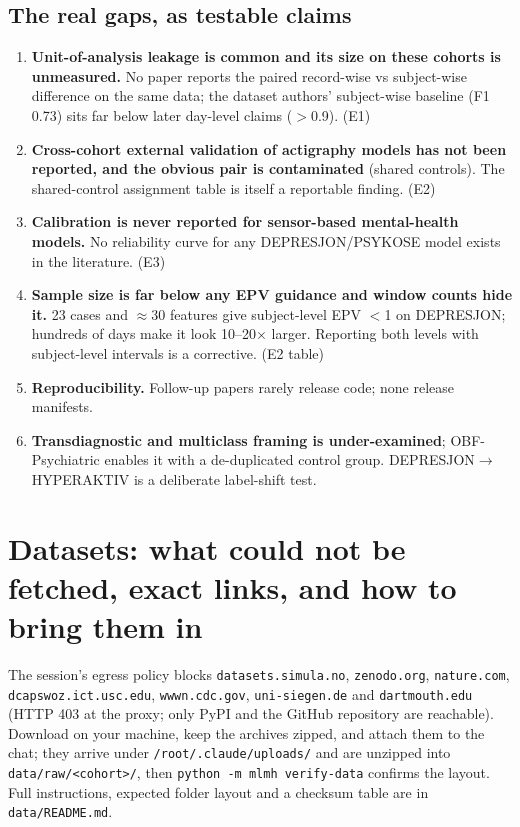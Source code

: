 \documentclass[11pt,a4paper]{article}
\begin{document}
\subsection{The real gaps, as testable claims}
\begin{enumerate}
\item \textbf{Unit-of-analysis leakage is common and its size on these cohorts is unmeasured.} No
paper reports the paired record-wise vs subject-wise difference on the same data; the dataset
authors' subject-wise baseline (F1 0.73) sits far below later day-level claims ($>$0.9). (E1)
\item \textbf{Cross-cohort external validation of actigraphy models has not been reported, and the
obvious pair is contaminated} (shared controls). The shared-control assignment table is itself a
reportable finding. (E2)
\item \textbf{Calibration is never reported for sensor-based mental-health models.} No reliability
curve for any DEPRESJON/PSYKOSE model exists in the literature. (E3)
\item \textbf{Sample size is far below any EPV guidance and window counts hide it.} 23 cases and
$\approx$30 features give subject-level EPV $<$1 on DEPRESJON; hundreds of days make it look 10--20$\times$
larger. Reporting both levels with subject-level intervals is a corrective. (E2 table)
\item \textbf{Reproducibility.} Follow-up papers rarely release code; none release manifests.
\item \textbf{Transdiagnostic and multiclass framing is under-examined}; OBF-Psychiatric enables it
with a de-duplicated control group. DEPRESJON$\rightarrow$HYPERAKTIV is a deliberate label-shift test.
\end{enumerate}

\section{Datasets: what could not be fetched, exact links, and how to bring them in}\label{sec:data}
The session's egress policy blocks \texttt{datasets.simula.no}, \texttt{zenodo.org},
\texttt{nature.com}, \texttt{dcapswoz.ict.usc.edu}, \texttt{wwwn.cdc.gov}, \texttt{uni-siegen.de} and
\texttt{dartmouth.edu} (HTTP 403 at the proxy; only PyPI and the GitHub repository are reachable).
Download on your machine, keep the archives zipped, and attach them to the chat; they arrive under
\texttt{/root/.claude/uploads/} and are unzipped into \texttt{data/raw/<cohort>/}, then
\texttt{python -m mlmh verify-data} confirms the layout. Full instructions, expected folder layout and
a checksum table are in \texttt{data/README.md}.
\end{document}
